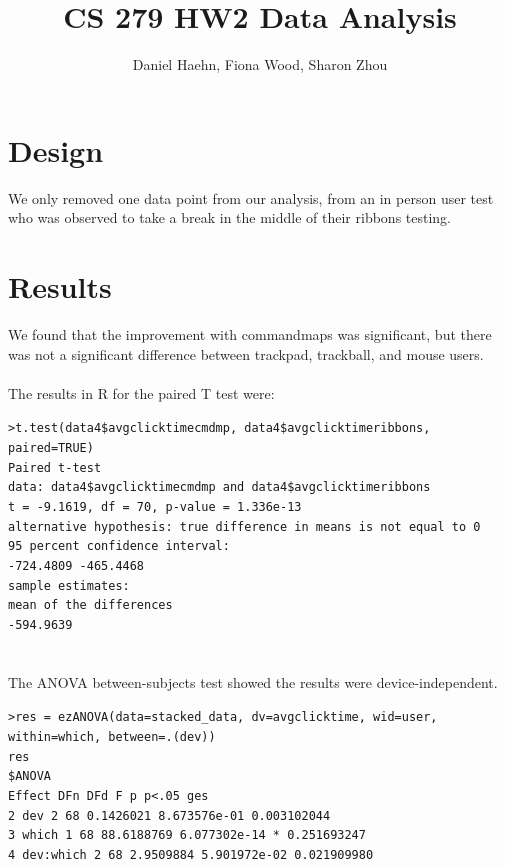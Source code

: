 \documentclass[10pt,a4paper]{article}
\author{Daniel Haehn, Fiona Wood, Sharon Zhou}
\title{CS 279 HW2 Data Analysis}
\begin{document}
\maketitle
\section{Design}
We only removed one data point from our analysis, from an in person user test who was observed to take a break in the middle of their ribbons testing.
\section{Results}
We found that the improvement with commandmaps was significant, but there was not a significant difference between trackpad, trackball, and mouse users. 
\\ \\
The results in R for the paired T test were: 

\texttt{>t.test(data4\$avgclicktimecmdmp, data4\$avgclicktimeribbons, paired=TRUE) \\
Paired t-test \\
data:  data4\$avgclicktimecmdmp and data4\$avgclicktimeribbons \\
t = -9.1619, df = 70, p-value = 1.336e-13 \\
alternative hypothesis: true difference in means is not equal to 0 \\
95 percent confidence interval: \\
 -724.4809 -465.4468 \\
sample estimates: \\
mean of the differences \\
              -594.9639 }
\\ \\ \\
The ANOVA between-subjects test showed the results were device-independent.

\texttt{>res = ezANOVA(data=stacked\_data, dv=avgclicktime, wid=user, within=which, between=.(dev))\\
res\\
\$ANOVA \\
     Effect DFn DFd          F            p p<.05         ges \\
2       dev   2  68  0.1426021 8.673576e-01       0.003102044 \\
3     which   1  68 88.6188769 6.077302e-14     * 0.251693247 \\
4 dev:which   2  68  2.9509884 5.901972e-02       0.021909980}
\\ \\ \\
\end{document}
